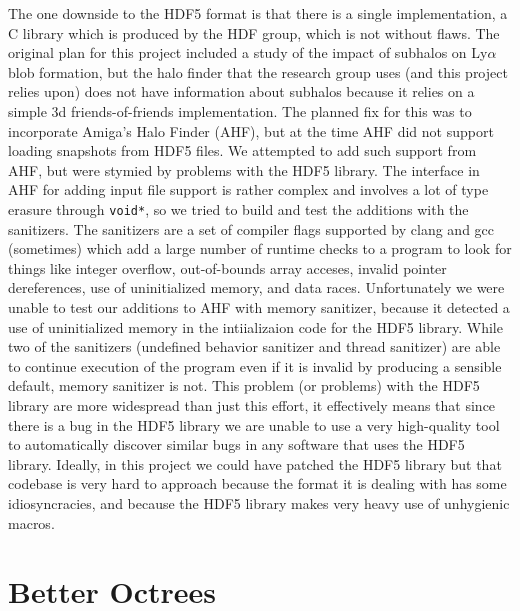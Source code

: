 The one downside to the HDF5 format is that there is a single implementation, a C library which is produced by the HDF group, which is not without flaws.
The original plan for this project included a study of the impact of subhalos on Ly$\alpha$ blob formation, but the halo finder that the research group uses (and this project relies upon) does not have information about subhalos because it relies on a simple 3d friends-of-friends implementation.
The planned fix for this was to incorporate Amiga's Halo Finder (AHF), but at the time AHF did not support loading snapshots from HDF5 files.
We attempted to add such support from AHF, but were stymied by problems with the HDF5 library.
The interface in AHF for adding input file support is rather complex and involves a lot of type erasure through \lstinline{void*}, so we tried to build and test the additions with the sanitizers.
The sanitizers are a set of compiler flags supported by clang and gcc (sometimes) which add a large number of runtime checks to a program to look for things like integer overflow, out-of-bounds array acceses, invalid pointer dereferences, use of uninitialized memory, and data races.
Unfortunately we were unable to test our additions to AHF with memory sanitizer, because it detected a use of uninitialized memory in the intiializaion code for the HDF5 library.
While two of the sanitizers (undefined behavior sanitizer and thread sanitizer) are able to continue execution of the program even if it is invalid by producing a sensible default, memory sanitizer is not.
This problem (or problems) with the HDF5 library are more widespread than just this effort, it effectively means that since there is a bug in the HDF5 library we are unable to use a very high-quality tool to automatically discover similar bugs in any software that uses the HDF5 library.
Ideally, in this project we could have patched the HDF5 library but that codebase is very hard to approach because the format it is dealing with has some idiosyncracies, and because the HDF5 library makes very heavy use of unhygienic macros.

\section{Better Octrees}

